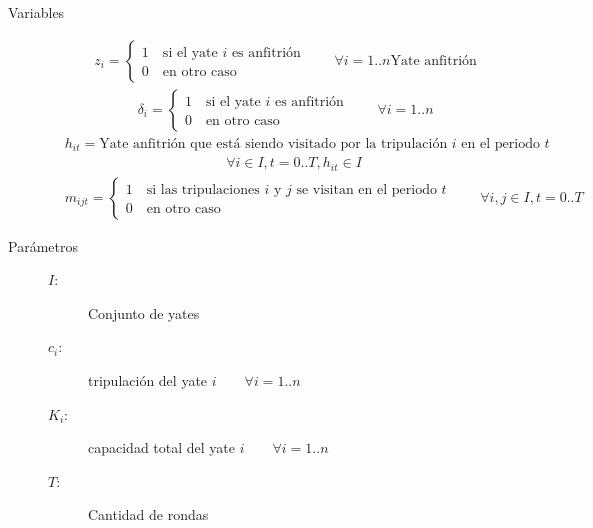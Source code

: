 \documentclass[letter, 10pt]{article}
\begin{document}
\begin{description}
    \item[Variables] \hfill
    \begin{align*}
        &z_i = \begin{cases} 1 \quad \text{si el yate $i$ es anfitrión} \\ 0 \quad \text{en otro caso} \end{cases}
        \qquad \forall i=1..n \text{Yate anfitrión}
    \end{align*}
    \begin{align*}
        &\delta_i = \begin{cases} 1 \quad \text{si el yate $i$ es anfitrión} \\ 0 \quad \text{en otro caso} \end{cases}
        \qquad \forall i=1..n
      \end{align*}
      \begin{align*}
          &h_{it} = \text{Yate anfitrión que está siendo visitado por la tripulación $i$ en el periodo $t$}
      \end{align*}
      \begin{align*}
           \qquad \forall i\in I, t=0..T, h_{it}\in I
      \end{align*}
      \begin{align*}
        &m_{ijt} = \begin{cases} 1 \quad \text{si las tripulaciones $i$ y $j$ se visitan en el periodo $t$} \\ 0 \quad \text{en otro caso} \end{cases}
        \qquad \forall i,j\in I, t=0..T
      \end{align*}
  \item[Parámetros] \hfill
    \begin{description}
      \item[$I$:] Conjunto de yates
      \item[$c_i$:] tripulación del yate $i \qquad \forall i=1..n$
      \item[$K_i$:] capacidad total del yate $i \qquad \forall i=1..n$
      \item[$T$:] Cantidad de rondas
    \end{description}


\end{description}
\end{document}
